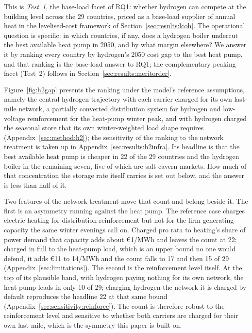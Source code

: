 This is \emph{Test~1}, the base-load facet of RQ1: whether hydrogen can compete at the
building level across the 29 countries, priced as a base-load supplier of annual heat in
the levelised-cost framework of Section~\ref{sec:results:lcoh}. The operational question
is specific: in which countries, if any, does a hydrogen boiler undercut the best
available heat pump in 2050, and by what margin elsewhere? We answer it by ranking every
country by hydrogen's 2050 cost gap to the best heat pump, and that ranking is the base-load answer to RQ1; the complementary peaking facet (Test~2) follows in
Section~\ref{sec:results:meritorder}.

Figure~\ref{fig:h2gap} presents the ranking under the model's reference assumptions,
namely the central hydrogen trajectory with each carrier charged for its own last-mile
network, a partially converted distribution system for hydrogen and low-voltage
reinforcement for the heat-pump winter peak, and with hydrogen charged the seasonal
store that its own winter-weighted load shape requires (Appendix~\ref{sec:method:h2});
the sensitivity of the ranking to the network treatment is taken up in
Appendix~\ref{sec:results:h2infra}. Its headline is that the best available heat pump
is cheaper in 22 of the 29 countries and the hydrogen boiler in the remaining seven,
five of which are salt-cavern markets. How much of that concentration the storage
rate itself carries is set out below, and the answer is less than half of it.

Two features of the network treatment move that count and belong beside it. The first
is an asymmetry running against the heat pump. The reference case charges electric
heating for distribution reinforcement but not for the firm generating capacity the same
winter evenings call on. Charged pro rata to heating's share of power demand that
capacity adds about \euro{}1/MWh and leaves the count at 22; charged in full to the
heat-pump load, which is an upper bound no one would defend, it adds \euro{}11 to
14/MWh and the count falls to 17 and then 15 of 29
(Appendix~\ref{sec:limitations}). The second is the reinforcement level itself. At the
top of its plausible band, with hydrogen paying nothing for its own network, the heat
pump leads in only 10 of 29; charging hydrogen the network it is charged by default
reproduces the headline 22 at that same bound
(Appendix~\ref{sec:sensitivity:reinforce}). The count is therefore robust to the
reinforcement level and sensitive to whether both carriers are charged for their own
last mile, which is the symmetry this paper is built on.

